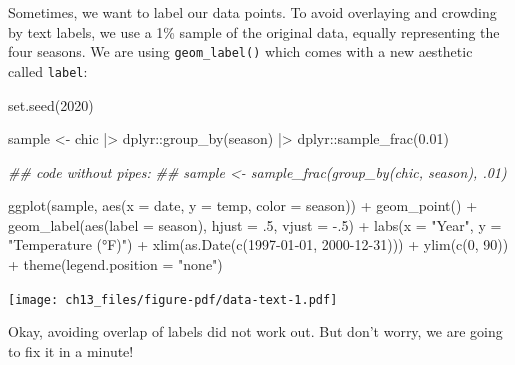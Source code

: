 \documentclass[
  letterpaper,
]{scrbook}
\newenvironment{Shaded}{\begin{snugshade}}{\end{snugshade}}
\newcommand{\AttributeTok}[1]{\textcolor[rgb]{0.40,0.45,0.13}{#1}}
\newcommand{\DecValTok}[1]{\textcolor[rgb]{0.68,0.00,0.00}{#1}}
\newcommand{\DocumentationTok}[1]{\textcolor[rgb]{0.37,0.37,0.37}{\textit{#1}}}
\newcommand{\FloatTok}[1]{\textcolor[rgb]{0.68,0.00,0.00}{#1}}
\newcommand{\FunctionTok}[1]{\textcolor[rgb]{0.28,0.35,0.67}{#1}}
\newcommand{\NormalTok}[1]{\textcolor[rgb]{0.00,0.23,0.31}{#1}}
\newcommand{\OtherTok}[1]{\textcolor[rgb]{0.00,0.23,0.31}{#1}}
\newcommand{\SpecialCharTok}[1]{\textcolor[rgb]{0.37,0.37,0.37}{#1}}
\newcommand{\StringTok}[1]{\textcolor[rgb]{0.13,0.47,0.30}{#1}}
\begin{document}
Sometimes, we want to label our data points. To avoid overlaying and
crowding by text labels, we use a 1\% sample of the original data,
equally representing the four seasons. We are using
\texttt{geom\_label()} which comes with a new aesthetic called
\texttt{label}:

\begin{Shaded}
\begin{Highlighting}[]
\FunctionTok{set.seed}\NormalTok{(}\DecValTok{2020}\NormalTok{)}

\NormalTok{sample }\OtherTok{\textless{}{-}}\NormalTok{ chic }\SpecialCharTok{|\textgreater{}}
\NormalTok{  dplyr}\SpecialCharTok{::}\FunctionTok{group\_by}\NormalTok{(season) }\SpecialCharTok{|\textgreater{}}
\NormalTok{  dplyr}\SpecialCharTok{::}\FunctionTok{sample\_frac}\NormalTok{(}\FloatTok{0.01}\NormalTok{)}

\DocumentationTok{\#\# code without pipes:}
\DocumentationTok{\#\# sample \textless{}{-} sample\_frac(group\_by(chic, season), .01)}

\FunctionTok{ggplot}\NormalTok{(sample, }\FunctionTok{aes}\NormalTok{(}\AttributeTok{x =}\NormalTok{ date, }\AttributeTok{y =}\NormalTok{ temp, }\AttributeTok{color =}\NormalTok{ season)) }\SpecialCharTok{+}
  \FunctionTok{geom\_point}\NormalTok{() }\SpecialCharTok{+}
  \FunctionTok{geom\_label}\NormalTok{(}\FunctionTok{aes}\NormalTok{(}\AttributeTok{label =}\NormalTok{ season), }\AttributeTok{hjust =}\NormalTok{ .}\DecValTok{5}\NormalTok{, }\AttributeTok{vjust =} \SpecialCharTok{{-}}\NormalTok{.}\DecValTok{5}\NormalTok{) }\SpecialCharTok{+}
  \FunctionTok{labs}\NormalTok{(}\AttributeTok{x =} \StringTok{"Year"}\NormalTok{, }\AttributeTok{y =} \StringTok{"Temperature (°F)"}\NormalTok{) }\SpecialCharTok{+}
  \FunctionTok{xlim}\NormalTok{(}\FunctionTok{as.Date}\NormalTok{(}\FunctionTok{c}\NormalTok{(}\StringTok{\textquotesingle{}1997{-}01{-}01\textquotesingle{}}\NormalTok{, }\StringTok{\textquotesingle{}2000{-}12{-}31\textquotesingle{}}\NormalTok{))) }\SpecialCharTok{+}
  \FunctionTok{ylim}\NormalTok{(}\FunctionTok{c}\NormalTok{(}\DecValTok{0}\NormalTok{, }\DecValTok{90}\NormalTok{)) }\SpecialCharTok{+}
  \FunctionTok{theme}\NormalTok{(}\AttributeTok{legend.position =} \StringTok{"none"}\NormalTok{)}
\end{Highlighting}
\end{Shaded}

\texttt{[image: ch13\_files/figure-pdf/data-text-1.pdf]}

Okay, avoiding overlap of labels did not work out. But don't worry, we
are going to fix it in a minute!
\end{document}
